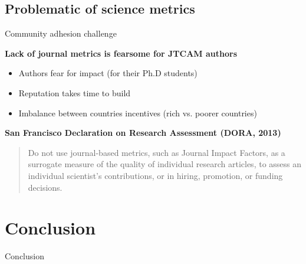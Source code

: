 \documentclass[10pt,compress,serif,aspectratio=169]{beamer}
\begin{document}
\subsection{Problematic of science metrics}
\begin{frame}[t]{Community adhesion challenge}

  \textbf{Lack of journal metrics is fearsome for JTCAM authors}
  \begin{itemize}
  \item Authors fear for impact (for their Ph.D students)
  \item Reputation takes time to build
  \item Imbalance between countries incentives (rich vs. poorer countries)
  \end{itemize}

  \vfill
  
  \textbf{San Francisco Declaration on Research Assessment (DORA, 2013)}
  \begin{quote}Do not use journal-based metrics, such as Journal Impact Factors, as a surrogate measure of the quality of individual research articles, to assess an individual scientist’s contributions, or in hiring, promotion, or funding decisions.\end{quote}

\end{frame}

\section{Conclusion}
\begin{frame}[t]{Conclusion}


\end{frame}
\end{document}
